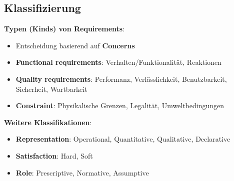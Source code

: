 \subsection{Klassifizierung}
\label{rq:sub:klassifizierung}

\textbf{Typen (Kinds) von Requirements}:
\begin{itemize}
	\item Entscheidung basierend auf \textbf{Concerns}
	\item \textbf{Functional requirements}: Verhalten/Funktionalität, Reaktionen
	\item \textbf{Quality requirements}: Performanz, Verlässlichkeit, Benutzbarkeit, Sicherheit, Wartbarkeit
	\item \textbf{Constraint}: Physikalische Grenzen, Legalität, Umweltbedingungen
\end{itemize}
\textbf{Weitere Klassifikationen}:
\begin{itemize}
	\item \textbf{Representation}: Operational, Quantitative, Qualitative, Declarative
	\item \textbf{Satisfaction}: Hard, Soft
	\item \textbf{Role}: Prescriptive, Normative, Assumptive
\end{itemize}